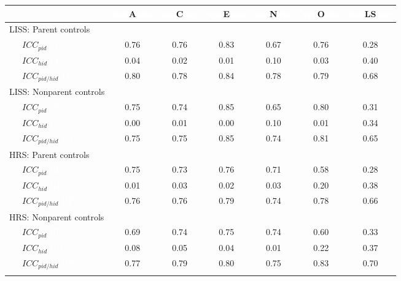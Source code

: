 \documentclass[
  english,
  man, noextraspace,floatsintext]{apa7}
\begin{document}
\begin{appendix}
\begin{table}[h]
\begin{center}
\begin{threeparttable}
\begin{tabular}{lcccccc}
\toprule
& \multicolumn{1}{c}{\textcolor{white}{xxx}A\textcolor{white}{xxx}} & \multicolumn{1}{c}{\textcolor{white}{xxx}C\textcolor{white}{xxx}} & \multicolumn{1}{c}{\textcolor{white}{xxx}E\textcolor{white}{xxx}} & \multicolumn{1}{c}{\textcolor{white}{xxx}N\textcolor{white}{xxx}} & \multicolumn{1}{c}{\textcolor{white}{xxx}O\textcolor{white}{xxx}} & \multicolumn{1}{c}{\textcolor{white}{xxx}LS\textcolor{white}{xxx}}\\
\midrule
LISS: Parent controls &  &  &  &  &  & \\
\ \ \ $ICC_{pid}$ \textcolor{white}{LP} & 0.76 & 0.76 & 0.83 & 0.67 & 0.76 & 0.28\\
\ \ \ $ICC_{hid}$ \textcolor{white}{LP} & 0.04 & 0.02 & 0.01 & 0.10 & 0.03 & 0.40\\
\ \ \ $ICC_{pid/hid}$ \textcolor{white}{LP} & 0.80 & 0.78 & 0.84 & 0.78 & 0.79 & 0.68\\
LISS: Nonparent controls &  &  &  &  &  & \\
\ \ \ $ICC_{pid}$ \textcolor{white}{LN} & 0.75 & 0.74 & 0.85 & 0.65 & 0.80 & 0.31\\
\ \ \ $ICC_{hid}$ \textcolor{white}{LN} & 0.00 & 0.01 & 0.00 & 0.10 & 0.01 & 0.34\\
\ \ \ $ICC_{pid/hid}$ \textcolor{white}{LN} & 0.75 & 0.75 & 0.85 & 0.74 & 0.81 & 0.65\\
HRS: Parent controls &  &  &  &  &  & \\
\ \ \ $ICC_{pid}$ \textcolor{white}{HP} & 0.75 & 0.73 & 0.76 & 0.71 & 0.58 & 0.28\\
\ \ \ $ICC_{hid}$ \textcolor{white}{HP} & 0.01 & 0.03 & 0.02 & 0.03 & 0.20 & 0.38\\
\ \ \ $ICC_{pid/hid}$ \textcolor{white}{HP} & 0.76 & 0.76 & 0.79 & 0.74 & 0.78 & 0.66\\
HRS: Nonparent controls &  &  &  &  &  & \\
\ \ \ $ICC_{pid}$ \textcolor{white}{HN} & 0.69 & 0.74 & 0.75 & 0.74 & 0.60 & 0.33\\
\ \ \ $ICC_{hid}$ \textcolor{white}{HN} & 0.08 & 0.05 & 0.04 & 0.01 & 0.22 & 0.37\\
\ \ \ $ICC_{pid/hid}$ \textcolor{white}{HN} & 0.77 & 0.79 & 0.80 & 0.75 & 0.83 & 0.70\\
\bottomrule
\addlinespace
\end{tabular}


\end{threeparttable}
\end{center}
\end{table}
\end{appendix}
\end{document}
